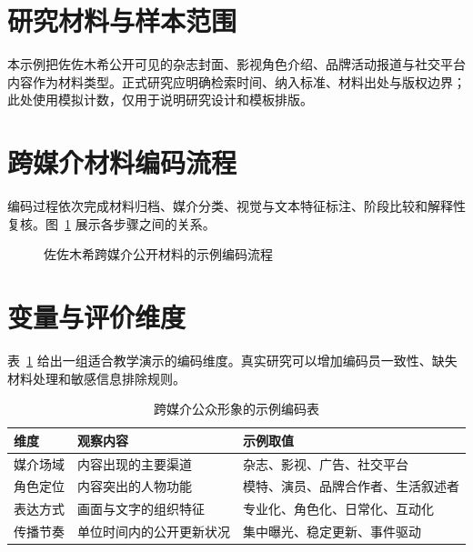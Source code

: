 
\section{研究材料与样本范围}

本示例把佐佐木希公开可见的杂志封面、影视角色介绍、品牌活动报道与社交平台内容作为材料类型。正式研究应明确检索时间、纳入标准、材料出处与版权边界；此处使用模拟计数，仅用于说明研究设计和模板排版。

\section{跨媒介材料编码流程}

编码过程依次完成材料归档、媒介分类、视觉与文本特征标注、阶段比较和解释性复核。图~\ref{fig:jlau-coding-flow} 展示各步骤之间的关系。

\begin{figure}[htbp]
  \centering
  \caption{佐佐木希跨媒介公开材料的示例编码流程}
  \label{fig:jlau-coding-flow}
\end{figure}

\section{变量与评价维度}

表~\ref{tab:jlau-codebook} 给出一组适合教学演示的编码维度。真实研究可以增加编码员一致性、缺失材料处理和敏感信息排除规则。

\begin{table}[htbp]
  \centering
  \caption{跨媒介公众形象的示例编码表}
  \label{tab:jlau-codebook}
  \begin{tabularx}{0.92\textwidth}{>{\centering\arraybackslash}p{2.4cm}XX}
    \toprule
    维度 & 观察内容 & 示例取值 \\
    \midrule
    媒介场域 & 内容出现的主要渠道 & 杂志、影视、广告、社交平台 \\
    角色定位 & 内容突出的人物功能 & 模特、演员、品牌合作者、生活叙述者 \\
    表达方式 & 画面与文字的组织特征 & 专业化、角色化、日常化、互动化 \\
    传播节奏 & 单位时间内的公开更新状况 & 集中曝光、稳定更新、事件驱动 \\
    \bottomrule
  \end{tabularx}
\end{table}

